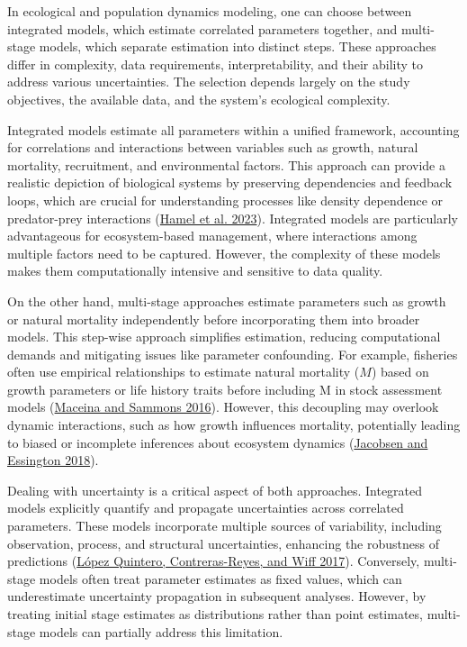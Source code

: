 \documentclass[
]{book}
\begin{document}
In ecological and population dynamics modeling, one can choose between integrated models, which estimate correlated parameters together, and multi-stage models, which separate estimation into distinct steps. These approaches differ in complexity, data requirements, interpretability, and their ability to address various uncertainties. The selection depends largely on the study objectives, the available data, and the system's ecological complexity.

Integrated models estimate all parameters within a unified framework, accounting for correlations and interactions between variables such as growth, natural mortality, recruitment, and environmental factors. This approach can provide a realistic depiction of biological systems by preserving dependencies and feedback loops, which are crucial for understanding processes like density dependence or predator-prey interactions (\protect\hyperlink{ref-MCAPAM2023}{Hamel et al. 2023}). Integrated models are particularly advantageous for ecosystem-based management, where interactions among multiple factors need to be captured. However, the complexity of these models makes them computationally intensive and sensitive to data quality.

On the other hand, multi-stage approaches estimate parameters such as growth or natural mortality independently before incorporating them into broader models. This step-wise approach simplifies estimation, reducing computational demands and mitigating issues like parameter confounding. For example, fisheries often use empirical relationships to estimate natural mortality (\(M\)) based on growth parameters or life history traits before including M in stock assessment models (\protect\hyperlink{ref-Maceina_etal_2016}{Maceina and Sammons 2016}). However, this decoupling may overlook dynamic interactions, such as how growth influences mortality, potentially leading to biased or incomplete inferences about ecosystem dynamics (\protect\hyperlink{ref-Jacobsen_etal_2018}{Jacobsen and Essington 2018}).

Dealing with uncertainty is a critical aspect of both approaches. Integrated models explicitly quantify and propagate uncertainties across correlated parameters. These models incorporate multiple sources of variability, including observation, process, and structural uncertainties, enhancing the robustness of predictions (\protect\hyperlink{ref-Luxf3pez_etal_2017}{López Quintero, Contreras-Reyes, and Wiff 2017}). Conversely, multi-stage models often treat parameter estimates as fixed values, which can underestimate uncertainty propagation in subsequent analyses. However, by treating initial stage estimates as distributions rather than point estimates, multi-stage models can partially address this limitation.
\end{document}

